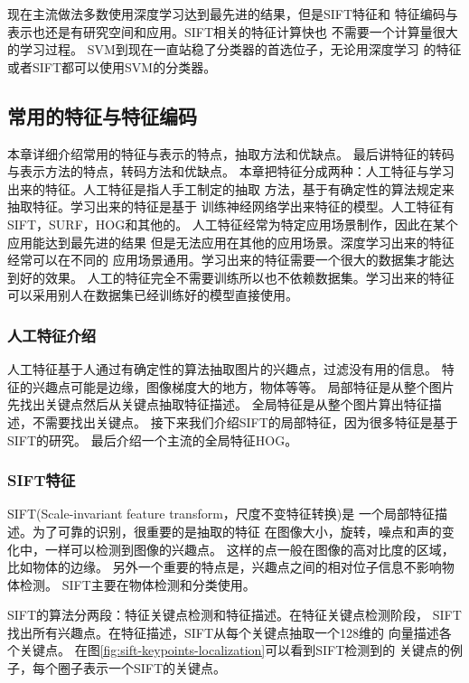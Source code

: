 现在主流做法多数使用深度学习达到最先进的结果，但是SIFT特征和
特征编码与表示也还是有研究空间和应用。SIFT相关的特征计算快也
不需要一个计算量很大的学习过程。
SVM到现在一直站稳了分类器的首选位子，无论用深度学习
的特征或者SIFT都可以使用SVM的分类器。

\subsection{常用的特征与特征编码}
\label{intro:image_features}
本章详细介绍常用的特征与表示的特点，抽取方法和优缺点。
最后讲特征的转码与表示方法的特点，转码方法和优缺点。
本章把特征分成两种：人工特征与学习出来的特征。人工特征是指人手工制定的抽取
方法，基于有确定性的算法规定来抽取特征。学习出来的特征是基于
训练神经网络学出来特征的模型。人工特征有SIFT，SURF，HOG和其他的。
人工特征经常为特定应用场景制作，因此在某个应用能达到最先进的结果
但是无法应用在其他的应用场景。深度学习出来的特征经常可以在不同的
应用场景通用。学习出来的特征需要一个很大的数据集才能达到好的效果。
人工的特征完全不需要训练所以也不依赖数据集。学习出来的特征
可以采用别人在数据集已经训练好的模型直接使用。

\subsubsection{人工特征介绍}
人工特征基于人通过有确定性的算法抽取图片的兴趣点，过滤没有用的信息。
特征的兴趣点可能是边缘，图像梯度大的地方，物体等等。
局部特征是从整个图片先找出关键点然后从关键点抽取特征描述。
全局特征是从整个图片算出特征描述，不需要找出关键点。
接下来我们介绍SIFT的局部特征，因为很多特征是基于SIFT的研究。
最后介绍一个主流的全局特征HOG。

\subsubsection{SIFT特征}
SIFT(Scale-invariant feature transform，尺度不变特征转换)是
一个局部特征描述。\cite{lowe1999object}为了可靠的识别，很重要的是抽取的特征
在图像大小，旋转，噪点和声的变化中，一样可以检测到图像的兴趣点。
这样的点一般在图像的高对比度的区域，比如物体的边缘。
另外一个重要的特点是，兴趣点之间的相对位子信息不影响物体检测。
SIFT主要在物体检测和分类使用。

SIFT的算法分两段：特征关键点检测和特征描述。在特征关键点检测阶段，
SIFT找出所有兴趣点。在特征描述，SIFT从每个关键点抽取一个128维的
向量描述各个关键点。\cite{wiki:sift}
在图\ref{fig:sift-keypoints-localization}可以看到SIFT检测到的
关键点的例子，每个圈子表示一个SIFT的关键点。

